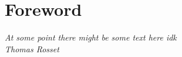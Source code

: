 \section*{Foreword}
\emph{At some point there might be some text here idk\\}
\bigskip
\textit{\hspace{0.5\textwidth}Thomas Rosset}
